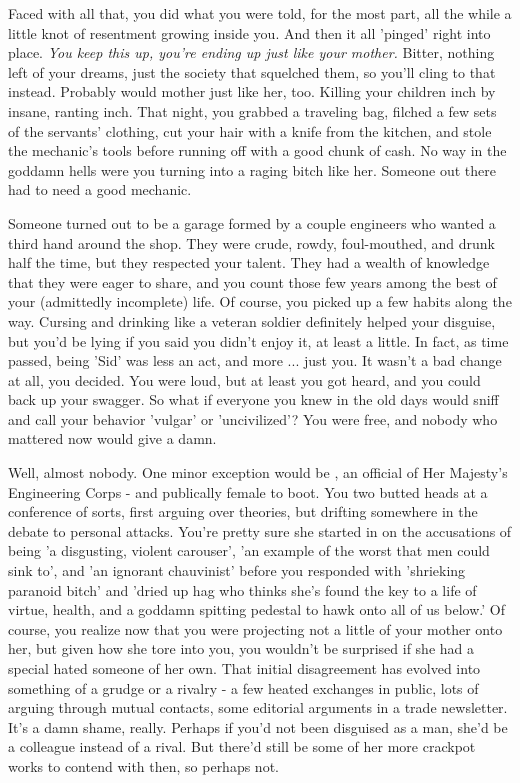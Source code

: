 \documentclass[char]{airship}
\begin{document}
Faced with all that, you did what you were told, for the most part,
all the while a little knot of resentment growing inside you. And then
it all 'pinged' right into place. \emph{You keep this up, you're
ending up just like your mother.} Bitter, nothing left of your dreams,
just the society that squelched them, so you'll cling to that
instead. Probably would mother just like her, too. Killing your
children inch by insane, ranting inch. That night, you grabbed a
traveling bag, filched a few sets of the servants' clothing, cut your
hair with a knife from the kitchen, and stole the mechanic's tools
before running off with a good chunk of cash. No way in the goddamn
hells were you turning into a raging bitch like her. Someone out there
had to need a good mechanic.

Someone turned out to be a garage formed by a couple engineers who
wanted a third hand around the shop. They were crude, rowdy,
foul-mouthed, and drunk half the time, but they respected your
talent. They had a wealth of knowledge that they were eager to share,
and you count those few years among the best of your (admittedly
incomplete) life. Of course, you picked up a few habits along the
way. Cursing and drinking like a veteran soldier definitely helped
your disguise, but you'd be lying if you said you didn't enjoy it, at
least a little. In fact, as time passed, being 'Sid' was less an act,
and more ... just you. It wasn't a bad change at all, you decided. You
were loud, but at least you got heard, and you could back up your
swagger. So what if everyone you knew in the old days would sniff and
call your behavior 'vulgar' or 'uncivilized'? You were free, and
nobody who mattered now would give a damn.

Well, almost nobody. One minor exception would be \cCurie{\intro}, an
official of Her Majesty's Engineering Corps - and publically female to
boot. You two butted heads at a conference of sorts, first arguing
over theories, but drifting somewhere in the debate to personal
attacks. You're pretty sure she started in on the accusations of being
'a disgusting, violent carouser', 'an example of the worst that men
could sink to', and 'an ignorant chauvinist' before you responded with
'shrieking paranoid bitch' and 'dried up hag who thinks she's found
the key to a life of virtue, health, and a goddamn spitting pedestal
to hawk onto all of us below.' Of course, you realize now that you
were projecting not a little of your mother onto her, but given how
she tore into you, you wouldn't be surprised if she had a special hated
someone of her own. That initial disagreement has evolved into
something of a grudge or a rivalry - a few heated exchanges in public,
lots of arguing through mutual contacts, some editorial arguments in a
trade newsletter. It's a damn shame, really. Perhaps if you'd not been
disguised as a man, she'd be a colleague instead of a rival. But
there'd still be some of her more crackpot works to contend with then,
so perhaps not.
\end{document}
